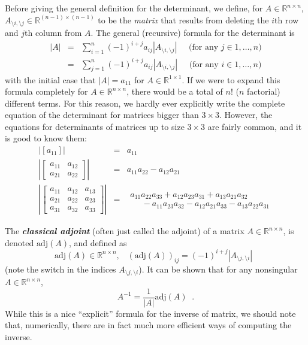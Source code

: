 \documentclass[12pt]{article}
\begin{document}
Before giving the general definition for the determinant, we define,
for $A \in \mathbb{R}^{n \times n}$, $A_{\setminus i,\setminus j} \in
\mathbb{R}^{(n-1) \times (n-1)}$ to be the \textit{matrix} that
results from deleting the $i$th row and $j$th column from $A$.  The
general (recursive) formula for the determinant is
\begin{eqnarray*}
|A| & = & \sum_{i=1}^n (-1)^{i+j} a_{ij} |A_{\setminus i, \setminus
  j}| \;\;\;\;\;\mbox{(for any $j \in 1,\ldots, n$)} \\
& = & \sum_{j=1}^n (-1)^{i+j} a_{ij} |A_{\setminus i, \setminus j}|
  \;\;\;\;\;\mbox{(for any $i \in 1,\ldots, n$)}
\end{eqnarray*}
with the initial case that $|A| = a_{11}$ for $ A \in
\mathbb{R}^{1 \times 1}$.   If we were to expand this formula
completely for $A \in \mathbb{R}^{n \times n}$, there would be a total
of $n!$ ($n$ factorial) different terms.  For this reason, we hardly
ever explicitly write the complete equation of the determinant for
matrices bigger than $3 \times 3$.  However, the equations for
determinants of matrices up to size $3 \times 3$ are fairly common,
and it is good to know them:
\begin{eqnarray*}
\left | [a_{11}] \right | & = & a_{11} \\
\left | \left [ \begin{array}{cc} a_{11} & a_{12} \\ a_{21} & a_{22}
  \end{array} \right ] \right | & = & a_{11} a_{22} - a_{12} a_{21} \\
\left | \left [ \begin{array}{ccc} a_{11} & a_{12} & a_{13} \\ a_{21}
    & a_{22} & a_{23} \\ a_{31} & a_{32} & a_{33} \end{array} \right ]
    \right | & = &\begin{array}{l} a_{11} a_{22} a_{33} + a_{12} a_{23} a_{31} +
    a_{13} a_{21} a_{32} \\ \;\;\;\;\; - a_{11} a_{23} a_{32} - a_{12}
    a_{21} a_{33} - a_{13} a_{22} a_{31} \end{array}
\end{eqnarray*}

The \textbf{\textit{classical adjoint}} (often just called the
adjoint) of a matrix $A \in \mathbb{R}^{n \times n}$, is denoted
$\mathrm{adj}(A)$, and defined as
\[\mathrm{adj}(A) \in \mathbb{R}^{n \times n}, \;\;\;
(\mathrm{adj}(A))_{ij} = (-1)^{i+j} |A_{\setminus j, \setminus
  i}|\;\;\]
(note the switch in the indices $A_{\setminus j, \setminus i}$).  It
  can be shown that for any nonsingular $A \in \mathbb{R}^{n \times 
  n}$,
\[A^{-1} = \frac{1}{|A|}\mathrm{adj}(A)\;\;.\]
While this is a nice ``explicit'' formula for the inverse of matrix,
we should note that, numerically, there are in fact much more
efficient ways of computing the inverse.
\end{document}
